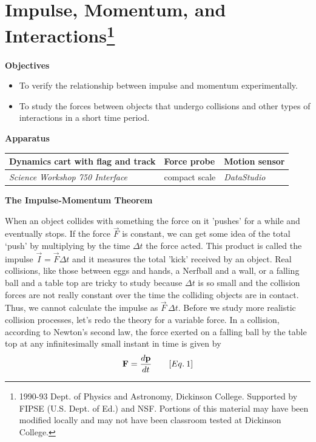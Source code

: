 
\section{Impulse, Momentum, and Interactions\footnote{
1990-93 Dept. of Physics and Astronomy, Dickinson College. Supported by FIPSE
(U.S. Dept. of Ed.) and NSF. Portions of this material may have been modified
locally and may not have been classroom tested at Dickinson College.
}}
\setcounter{activity}{0}


\makelabheader %

\textbf{Objectives }

\begin{itemize}
\item To verify the relationship between impulse and momentum experimentally. 
\item To study the forces between objects that undergo collisions and other types of interactions in a short time period.
\end{itemize}
\textbf{Apparatus} 

\begin{center}
\begin{tabular}{|l|l|l|} \hline
Dynamics cart with flag and track   & Force probe   & Motion sensor \\ \hline
{\it Science Workshop 750 Interface}& compact scale & {\it DataStudio} \\ \hline
\end{tabular}
\end{center}

\textbf{The Impulse-Momentum Theorem }

When an object collides with something the force on it 'pushes' for a while and eventually
stops.
If the force $\vec F$ is constant, we can get some idea of the total `push' by multiplying by
the time $\Delta t$ the force acted.
This product is called the impulse $\vec I = \vec F \Delta t$ and it measures
the total 'kick' received by an object.
Real collisions, like those between eggs and hands, a Nerfball and a wall, or
a falling ball and a table top are tricky to study because $\Delta t$ 
is so small and
the collision forces are not really constant over the time the colliding objects
are in contact. Thus, we cannot calculate the impulse as $\vec F \,\Delta t$. 
Before we study
more realistic collision processes, let's redo the theory for a variable force.
In a collision, according to Newton's second law, the force exerted on a falling
ball by the table top at any infinitesimally small instant in time is given
by
\[
{\bf F}=\frac{d{\bf p}}{dt}\qquad [Eq.\: 1]\]



